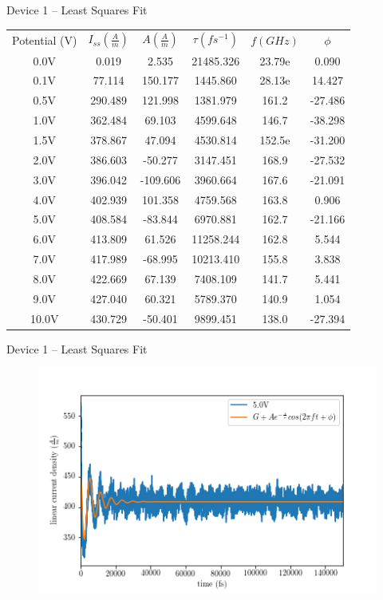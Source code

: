 \documentclass{beamer}
\begin{document}
\begin{frame}{Device 1 -- Least Squares Fit}
    \begin{table}[]
        \centering
        \begin{tabular}{c|c c c c c}
            Potential (V) & $I_{ss} \left( \frac{A}{m} \right)$ & $A \left( \frac{A}{m} \right)$ & $\tau (fs^{-1})$ & $f ({GHz})$ & $\phi$ \\
            0.0V & 0.019 & 2.535 & 21485.326 & 23.79e & 0.090 \\
            0.1V & 77.114 & 150.177 & 1445.860 & 28.13e & 14.427 \\
            0.5V & 290.489 & 121.998 & 1381.979 & 161.2 & -27.486 \\
            1.0V & 362.484 & 69.103 & 4599.648 & 146.7 & -38.298 \\
            1.5V & 378.867 & 47.094 & 4530.814 & 152.5e & -31.200 \\
            2.0V & 386.603 & -50.277 & 3147.451 & 168.9 & -27.532 \\
            3.0V & 396.042 & -109.606 & 3960.664 & 167.6 & -21.091 \\
            4.0V & 402.939 & 101.358 & 4759.568 & 163.8 & 0.906 \\
            5.0V & 408.584 & -83.844 & 6970.881 & 162.7 & -21.166 \\
            6.0V & 413.809 & 61.526 & 11258.244 & 162.8 & 5.544 \\
            7.0V & 417.989 & -68.995 & 10213.410 & 155.8 & 3.838 \\
            8.0V & 422.669 & 67.139 & 7408.109 & 141.7 & 5.441 \\
            9.0V & 427.040 & 60.321 & 5789.370 & 140.9 & 1.054 \\
            10.0V & 430.729 & -50.401 & 9899.451 & 138.0 & -27.394 \\
        \end{tabular}
        \label{tab:dev_1}
    \end{table}
\end{frame}

\begin{frame}{Device 1 -- Least Squares Fit}
    \begin{figure}
        \centering
        \includegraphics[scale=0.5]{Figures/Device_1/Curve_fit/5_0V.png}
        \label{fig:dev_1_lsq}
    \end{figure}
\end{frame}
\end{document}
